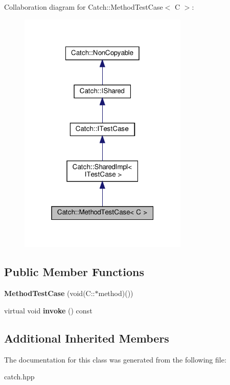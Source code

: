 Collaboration diagram for Catch\+:\+:Method\+Test\+Case$<$ C $>$\+:
\nopagebreak
\begin{figure}[H]
\begin{center}
\leavevmode
\includegraphics[width=229pt]{classCatch_1_1MethodTestCase__coll__graph}
\end{center}
\end{figure}
\subsection*{Public Member Functions}
\begin{DoxyCompactItemize}
\item 
\mbox{\label{classCatch_1_1MethodTestCase_a7b043b85dae371358255dd9dc6582e7b}} 
{\bfseries Method\+Test\+Case} (void(C\+::$\ast$method)())
\item 
\mbox{\label{classCatch_1_1MethodTestCase_a4e2263cfa0646f2980768328cb372793}} 
virtual void {\bfseries invoke} () const
\end{DoxyCompactItemize}
\subsection*{Additional Inherited Members}


The documentation for this class was generated from the following file\+:\begin{DoxyCompactItemize}
\item 
catch.\+hpp\end{DoxyCompactItemize}
